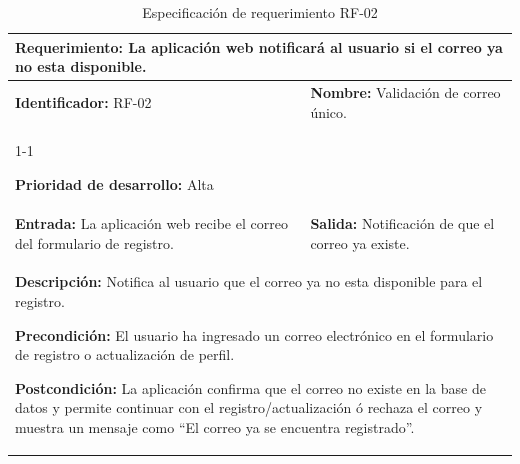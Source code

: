 \begin{table}[H]
\caption{Especificación de requerimiento RF-02}
\centering
\renewcommand{\arraystretch}{1.3}
\setlength{\tabcolsep}{6pt}

\begin{tabular}{|p{7cm}|p{8cm}|}
\hline

\multicolumn{2}{|p{15cm}|}{\textbf{Requerimiento:} La aplicación web notificará al usuario si el correo ya no esta disponible.} \\ \hline

\textbf{Identificador:} RF-02 &
\textbf{Nombre:} Validación de correo único. \\ \cline{1-1}

\textbf{Prioridad de desarrollo:} Alta &
\multicolumn{1}{p{8cm}|}{} \\ \hline
\textbf{Entrada:} La aplicación web recibe el correo del formulario de registro. &
\textbf{Salida:} Notificación de que el correo ya existe. \\ \hline

\multicolumn{2}{|p{15cm}|}{
\textbf{Descripción:} Notifica al usuario que el correo ya no esta disponible para el registro.

\vspace{0.2cm}

\textbf{Precondición:} El usuario ha ingresado un correo electrónico en el formulario de registro o actualización de perfil.

\vspace{0.2cm}

\textbf{Postcondición:} La aplicación confirma que el correo no existe en la base de datos y permite continuar con el registro/actualización ó rechaza el correo y muestra un mensaje como “El correo ya se encuentra registrado”.
} \\ \hline

\end{tabular}

\label{tab:rf3}

\end{table}


